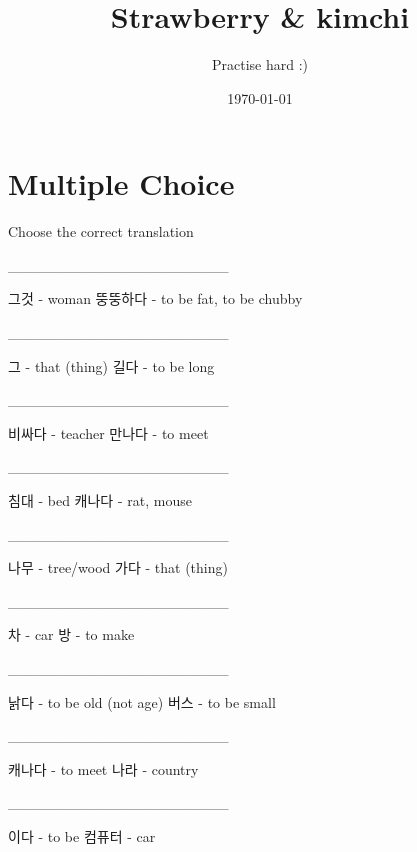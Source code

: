 \documentclass[addpoints, 30pt]{../exam}%
\title{Strawberry \& kimchi}%
\author{Practise hard :)}%
\date{\today}%
\begin{document}
%
\normalsize%
\maketitle%
\section{Multiple Choice}%
Choose the correct translation%
\begin{questions}%
\question[1]%
\_\_\_\_\_\_\_\_\_\_\_\_\_\_\_\_\_\_\_\_\_%
\begin{choices}%
\choice%
그것 {-} woman%
\CorrectChoice%
뚱뚱하다 {-} to be fat, to be chubby%
\end{choices}%
\question[1]%
\_\_\_\_\_\_\_\_\_\_\_\_\_\_\_\_\_\_\_\_\_%
\begin{choices}%
\choice%
그 {-} that (thing)%
\CorrectChoice%
길다 {-} to be long%
\end{choices}%
\question[1]%
\_\_\_\_\_\_\_\_\_\_\_\_\_\_\_\_\_\_\_\_\_%
\begin{choices}%
\choice%
비싸다 {-} teacher%
\CorrectChoice%
만나다 {-} to meet%
\end{choices}%
\question[1]%
\_\_\_\_\_\_\_\_\_\_\_\_\_\_\_\_\_\_\_\_\_%
\begin{choices}%
\CorrectChoice%
침대 {-} bed%
\choice%
캐나다 {-} rat, mouse%
\end{choices}%
\question[1]%
\_\_\_\_\_\_\_\_\_\_\_\_\_\_\_\_\_\_\_\_\_%
\begin{choices}%
\CorrectChoice%
나무 {-} tree/wood%
\choice%
가다 {-} that (thing)%
\end{choices}%
\question[1]%
\_\_\_\_\_\_\_\_\_\_\_\_\_\_\_\_\_\_\_\_\_%
\begin{choices}%
\CorrectChoice%
차 {-} car%
\choice%
방 {-} to make%
\end{choices}%
\question[1]%
\_\_\_\_\_\_\_\_\_\_\_\_\_\_\_\_\_\_\_\_\_%
\begin{choices}%
\CorrectChoice%
낡다 {-} to be old (not age)%
\choice%
버스 {-} to be small%
\end{choices}%
\question[1]%
\_\_\_\_\_\_\_\_\_\_\_\_\_\_\_\_\_\_\_\_\_%
\begin{choices}%
\choice%
캐나다 {-} to meet%
\CorrectChoice%
나라 {-} country%
\end{choices}%
\question[1]%
\_\_\_\_\_\_\_\_\_\_\_\_\_\_\_\_\_\_\_\_\_%
\begin{choices}%
\CorrectChoice%
이다 {-} to be%
\choice%
컴퓨터 {-} car%
\end{choices}%
\question[1]%

\end{questions}
\end{document}
